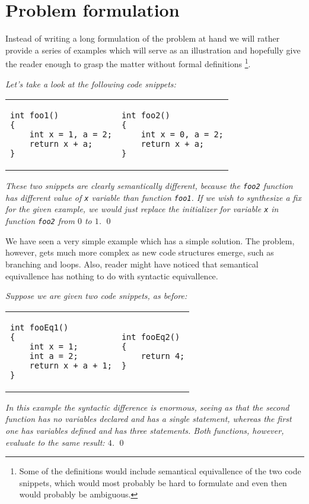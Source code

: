 \section{Problem formulation}
\label{sec:Formulation}

Instead of writing a long formulation of the problem at hand we will rather provide a series of examples which will serve as an illustration and hopefully give the reader enough to grasp the matter without formal definitions \footnote{Some of the definitions would include semantical equivallence of the two code snippets, which would most probably be hard to formulate and even then would probably be ambiguous.}.

\begin{exmp}
\textit{Let's take a look at the following code snippets:}

\begin{tabular}{ p{4.5cm} p{4.5cm} }
\begin{lstlisting}
int foo1()
{
    int x = 1, a = 2;
    return x + a;
}
\end{lstlisting}
&
\begin{lstlisting}
int foo2()
{
    int x = 0, a = 2;
    return x + a;
}
\end{lstlisting}
\end{tabular}

\textit{These two snippets are clearly semantically different, because the \texttt{foo2} function has different value of \texttt{x} variable than function \texttt{foo1}. If we wish to synthesize a fix for the given example, we would just replace the initializer for variable \texttt{x} in function \texttt{foo2}  from $0$ to $1$.}
\qed
\end{exmp}

We have seen a very simple example which has a simple solution. The problem, however, gets much more complex as new code structures emerge, such as branching and loops. Also, reader might have noticed that semantical equivallence has nothing to do with syntactic equivallence.

\begin{exmp}
\textit{Suppose we are given two code snippets, as before:}

\begin{tabular}{ p{4.5cm} p{4.5cm} }
\begin{lstlisting}
int fooEq1()
{
    int x = 1;
    int a = 2;
    return x + a + 1;
}
\end{lstlisting}
&
\begin{lstlisting}
int fooEq2()
{
    return 4;
}
\end{lstlisting}
\end{tabular}

\textit{In this example the syntactic difference is enormous, seeing as that the second function has no variables declared and has a single statement, whereas the first one has variables defined and has three statements. Both functions, however, evaluate to the same result: $4$.}
\qed
\label{exmp:DeleteExmp}
\end{exmp}

